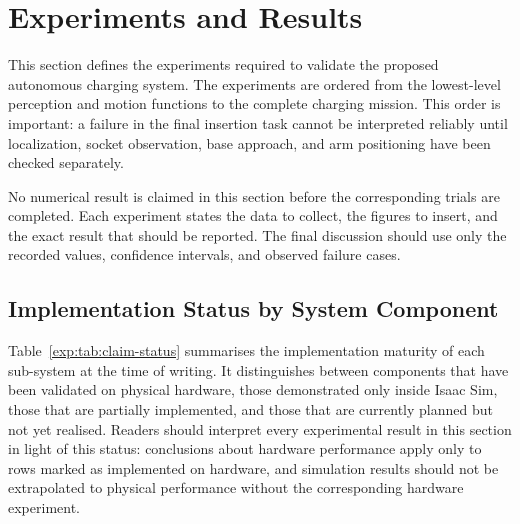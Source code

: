 
\begingroup
\providecommand{\SI}[2]{#1~#2}
\providecommand{\num}[1]{#1}
\providecommand{\milli}{m}
\providecommand{\centi}{c}
\providecommand{\meter}{m}
\providecommand{\second}{s}
\providecommand{\hertz}{Hz}
\providecommand{\degree}{\ensuremath{^{\circ}}}
\providecommand{\percent}{\%}

\newcommand{\expplaceholder}[3]{%
  \fbox{\begin{minipage}[c][0.135\textheight][c]{0.88\textwidth}
  \centering\footnotesize
  \textbf{PLACEHOLDER --- #1}\\[0.30em]
  \texttt{\detokenize{#2}}\\[0.45em]
  \raggedright #3
  \end{minipage}}%
}

\section{Experiments and Results}\label{exp:ch:experiments}

This section defines the experiments required to validate the proposed autonomous charging system. The experiments are ordered from the lowest-level perception and motion functions to the complete charging mission. This order is important: a failure in the final insertion task cannot be interpreted reliably until localization, socket observation, base approach, and arm positioning have been checked separately.

No numerical result is claimed in this section before the corresponding trials are completed. Each experiment states the data to collect, the figures to insert, and the exact result that should be reported. The final discussion should use only the recorded values, confidence intervals, and observed failure cases.

\subsection{Implementation Status by System Component}\label{exp:sec:status}

Table~\ref{exp:tab:claim-status} summarises the implementation maturity of each sub-system at the time of writing. It distinguishes between components that have been validated on physical hardware, those demonstrated only inside Isaac Sim, those that are partially implemented, and those that are currently planned but not yet realised. Readers should interpret every experimental result in this section in light of this status: conclusions about hardware performance apply only to rows marked as implemented on hardware, and simulation results should not be extrapolated to physical performance without the corresponding hardware experiment.

